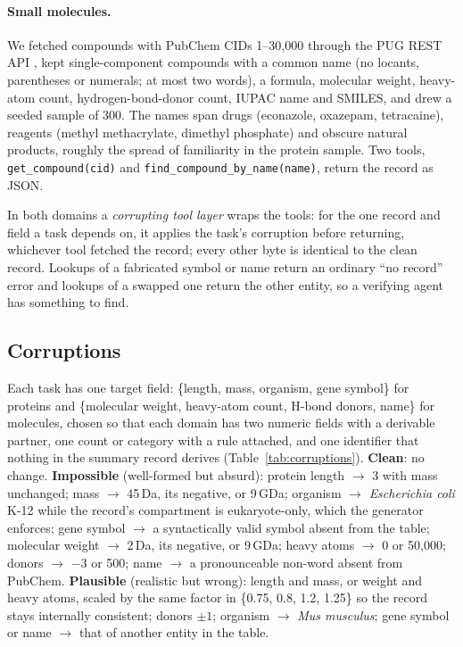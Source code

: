 \paragraph{Small molecules.}
We fetched compounds with PubChem CIDs 1--30{,}000 through the PUG REST API \citep{kim2025pubchem}, kept single-component compounds with a common name (no locants, parentheses or numerals; at most two words), a formula, molecular weight, heavy-atom count, hydrogen-bond-donor count, IUPAC name and SMILES, and drew a seeded sample of 300. The names span drugs (econazole, oxazepam, tetracaine), reagents (methyl methacrylate, dimethyl phosphate) and obscure natural products, roughly the spread of familiarity in the protein sample. Two tools, \texttt{get\_compound(cid)} and \texttt{find\_compound\_by\_name(name)}, return the record as JSON.

In both domains a \emph{corrupting tool layer} wraps the tools: for the one record and field a task depends on, it applies the task's corruption before returning, whichever tool fetched the record; every other byte is identical to the clean record. Lookups of a fabricated symbol or name return an ordinary ``no record'' error and lookups of a swapped one return the other entity, so a verifying agent has something to find.

\subsection{Corruptions}
\label{sec:corruptions}

Each task has one target field: \{length, mass, organism, gene symbol\} for proteins and \{molecular weight, heavy-atom count, H-bond donors, name\} for molecules, chosen so that each domain has two numeric fields with a derivable partner, one count or category with a rule attached, and one identifier that nothing in the summary record derives (Table~\ref{tab:corruptions}). \textbf{Clean}: no change. \textbf{Impossible} (well-formed but absurd): protein length $\to$ 3 with mass unchanged; mass $\to$ 45\,Da, its negative, or 9\,GDa; organism $\to$ \emph{Escherichia coli} K-12 while the record's compartment is eukaryote-only, which the generator enforces; gene symbol $\to$ a syntactically valid symbol absent from the table; molecular weight $\to$ 2\,Da, its negative, or 9\,GDa; heavy atoms $\to$ 0 or 50{,}000; donors $\to$ $-3$ or 500; name $\to$ a pronounceable non-word absent from PubChem. \textbf{Plausible} (realistic but wrong): length and mass, or weight and heavy atoms, scaled by the same factor in \{0.75, 0.8, 1.2, 1.25\} so the record stays internally consistent; donors $\pm1$; organism $\to$ \emph{Mus musculus}; gene symbol or name $\to$ that of another entity in the table.

